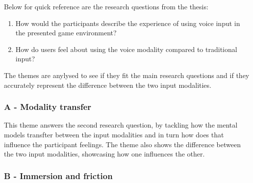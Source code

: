 

Below for quick reference are the research questions from the thesis: 

\begin{enumerate}
    \item How would the participants describe the experience of using voice input in the presented
game environment?
    \item How do users feel about using the voice modality compared to traditional input?
\end{enumerate}

The themes are anylysed to see if they fit the main research questions and if they accurately represent the difference between the two input modalities.

\subsubsection{A - Modality transfer}


This theme answers the second research question, by tackling how the mental models transfter between the input modalities and in turn how does that influence the participant feelings. 
The theme also shows the difference between the two input modalities, showcasing how one influences the other.


\subsubsection{B - Immersion and friction}


